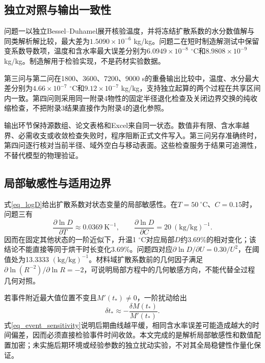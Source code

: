 \subsection{独立对照与输出一致性}
问题一以独立Bessel--Duhamel展开核验温度，并将冻结扩散系数的水分数值解与同类解析解比较，最大差为$1.5090\times10^{-6}$ kg/kg。问题二在短时制造解测试中保留变系数导数项，温度和含水率最大误差分别为$6.0949\times10^{-8}$ $^\circ$C和$8.9808\times10^{-9}$ kg/kg。制造解用于检验实现，不是药材实验数据。

第三问与第二问在1800、3600、7200、9000 s的重叠输出比较中，温度、水分最大差分别为$4.66\times10^{-7}$ $^\circ$C和$9.12\times10^{-7}$ kg/kg，支持独立起算的两个过程在共享区间内一致。第四问则采用同一附录4物性的固定半径退化检查及关闭边界交换的纯收缩检查，不把附录3结果直接作为附录4的退化参照。

输出环节保持源数组、论文表格和Excel来自同一状态。数值非有限、含水率越界、必需收支或收敛检查失败时，程序阻断正式文件写入。第三问另存准确终时，第四问逐行核对当前半径、域外空白与移动表面。这些检查服务于结果可追溯性，不替代模型的物理验证。

\subsection{局部敏感性与适用边界}
式\eqref{eq_logD}给出扩散系数对状态变量的局部敏感性。在$T=50\ ^\circ$C、$C=0.15$时，问题三有
\[
\frac{\partial\ln D}{\partial T}\approx0.0369\ \mathrm{K^{-1}},\qquad
\frac{\partial\ln D}{\partial C}=20\ \mathrm{(kg/kg)^{-1}}.
\]
因而在固定其他状态的一阶近似下，升温1 $^\circ$C对应局部$D$约3.69\%的相对变化；该结论不能直接等同于烘干时长变化3.69\%。问题四对应$\partial\ln D/\partial U=0.30/U^2$，在阈值处为13.3333 $(\mathrm{kg/kg})^{-1}$。材料域扩散系数前的几何因子满足$\partial\ln(R^{-2})/\partial\ln R=-2$，可说明局部方程中的几何敏感方向，不能代替全过程几何对照。

若事件附近最大值位置不变且$M'(t_*)\ne0$，一阶扰动给出
\begin{equation}\label{eq_event_sensitivity}
\delta t_*\approx-\frac{\delta M(t_*)}{M'(t_*)}.
\end{equation}
式\eqref{eq_event_sensitivity}说明后期曲线越平缓，相同含水率误差可能造成越大的时间偏差，因而必须直接检验事件时间收敛。本文完成的是解析局部敏感性和数值配置加密；未实施后期环境或经验参数的独立扰动实验，不对其全局稳健性作量化保证。
\FloatBarrier
